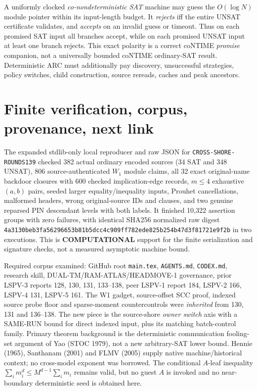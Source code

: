 \documentclass[11pt]{article}
\begin{document}
A uniformly clocked \emph{co-nondeterministic SAT} machine may guess the $O(\log N)$ module pointer within its input-length budget. It \emph{rejects} iff the entire UNSAT certificate validates, and \emph{accepts} on an invalid guess or timeout. Thus on each promised SAT input all branches accept, while on each promised UNSAT input at least one branch rejects. This exact polarity is a correct coNTIME \emph{promise} companion, not a universally bounded coNTIME ordinary-SAT result. Deterministic ARC must additionally pay discovery, unsuccessful strategies, policy switches, child construction, source rereads, caches and peak ancestors.

\section{Finite verification, corpus, provenance, next link}
The expanded stdlib-only local reproducer and raw JSON for \texttt{CROSS-SHORE-ROUNDS139} checked 382 actual ordinary encoded sources (34 SAT and 348 UNSAT), 806 source-authenticated $W_1$ module claims, all 32 exact original-name backdoor closures with 600 checked implication-edge records, $m\le4$ exhaustive $(a,b)$ pairs, seeded larger equality/inequality inputs, Prouhet cancellations, malformed headers, wrong original-source IDs and clauses, and two genuine reparsed PIN descendant levels with both labels. It finished 10,322 assertion groups with zero failures, with identical SHA256 normalized raw digest \texttt{4a3130beb3fa56296653b81b5dcc4c909ff782ede825b254b47d3f81721e9f2b} in two executions. This is \textbf{COMPUTATIONAL} support for the finite serialization and signature checks, not a measured asymptotic machine bound.

Required corpus examined: GitHub root \texttt{main.tex}, \texttt{AGENTS.md}, \texttt{CODEX.md}, research skill, DUAL-TM/RAM-ATLAS/HEADMOVE-1 governance, prior LSPV-3 reports 128, 130, 131, 133--138, peer LSPV-1 report 184, LSPV-2 166, LSPV-4 131, LSPV-5 161. The W1 gadget, source-offset SCC proof, indexed source probe floor and sparse-moment countercontrols were \emph{inherited} from 130, 131 and 136--138. The new piece is the source-shore \emph{owner switch} axis with a SAME-RUN bound for direct indexed input, plus its matching batch-control family. Primary theorem background is the deterministic communication fooling-set argument of Yao (STOC 1979), not a new arbitrary-SAT lower bound. Hennie (1965), Santhanam (2001) and FLMV (2005) supply native machine/historical context; no cross-model exponent was borrowed. The conditional $A$-leaf inequality $\sum_i m_i^d\le M^{d-1}\sum_i m_i$ remains valid, but no guest $A$ is invoked and no near-boundary deterministic seed is obtained here.
\end{document}

